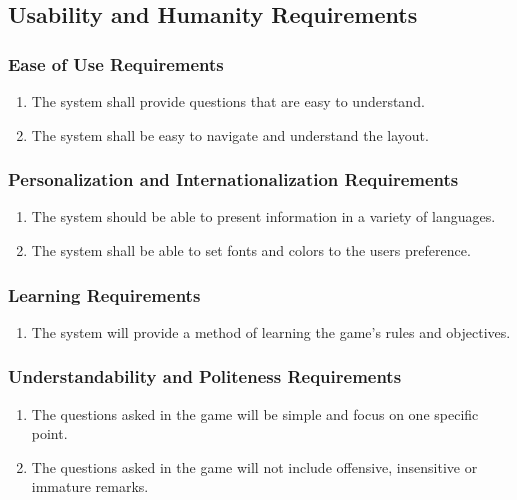 \documentclass[titlepage]{article}
\begin{document}
		
		\subsection{Usability and Humanity Requirements}
		\label{sub:usability_and_humanity_requirements}
		
		
		\subsubsection{Ease of Use Requirements}
		\label{ssub:ease_of_use_requirements}
		\begin{enumerate}[{UH}1.]
			\item 
			The system shall provide questions that are easy to understand.
			\item
			The system shall be easy to navigate and understand the layout.
		\end{enumerate}
		
		\subsubsection{Personalization and Internationalization Requirements}
		\label{ssub:personalization_and_internationalization_requirements}
		\begin{enumerate}[{UH}1. ]
			\item 
			The system should be able to present information in a variety of languages.
			\item
			The system shall be able to set fonts and colors to the users preference.
		\end{enumerate}
		
		\subsubsection{Learning Requirements}
		\label{ssub:learning_requirements}
		\begin{enumerate}[{UH}1. ]
			\item
			The system will provide a method of learning the game's rules and objectives.
		\end{enumerate}
		
		\subsubsection{Understandability and Politeness Requirements}
		\label{ssub:understandability_and_politeness_requirements}
		\begin{enumerate}[{UH}1. ]
			\item 
			The questions asked in the game will be simple and focus on one specific point. %
			\item
			The questions asked in the game will not include offensive, insensitive or immature remarks.
		\end{enumerate}
		
\end{document}
